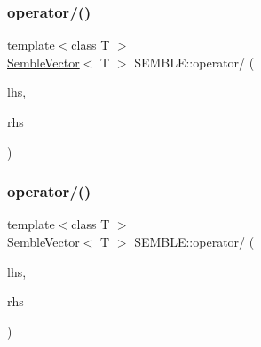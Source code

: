 \mbox{\label{namespaceSEMBLE_a59e18a0f579ad8102ffdbc5110750d91}} 
\subsubsection{\texorpdfstring{operator/()}{operator/()}\hspace{0.1cm}{\footnotesize\ttfamily [2/6]}}
{\footnotesize\ttfamily template$<$class T $>$ \\
\mbox{\hyperlink{structSEMBLE_1_1SembleVector}{Semble\+Vector}}$<$ T $>$ S\+E\+M\+B\+L\+E\+::operator/ (\begin{DoxyParamCaption}\item[{const \mbox{\hyperlink{structSEMBLE_1_1SembleVector}{Semble\+Vector}}$<$ T $>$ \&}]{lhs,  }\item[{const typename \mbox{\hyperlink{structSEMBLE_1_1PromoteScalar}{Promote\+Scalar}}$<$ T $>$\+::Type \&}]{rhs }\end{DoxyParamCaption})}

\mbox{\label{namespaceSEMBLE_a573e7bd88b8c454ba60e974c2b78cf81}} 
\subsubsection{\texorpdfstring{operator/()}{operator/()}\hspace{0.1cm}{\footnotesize\ttfamily [3/6]}}
{\footnotesize\ttfamily template$<$class T $>$ \\
\mbox{\hyperlink{structSEMBLE_1_1SembleVector}{Semble\+Vector}}$<$ T $>$ S\+E\+M\+B\+L\+E\+::operator/ (\begin{DoxyParamCaption}\item[{const \mbox{\hyperlink{structSEMBLE_1_1SembleVector}{Semble\+Vector}}$<$ T $>$ \&}]{lhs,  }\item[{const typename \mbox{\hyperlink{structSEMBLE_1_1PromoteEnsem}{Promote\+Ensem}}$<$ T $>$\+::Type \&}]{rhs }\end{DoxyParamCaption})}

\mbox{\label{namespaceSEMBLE_abe8b5c5cd589f2949e9c134d9fdc7b64}} 
